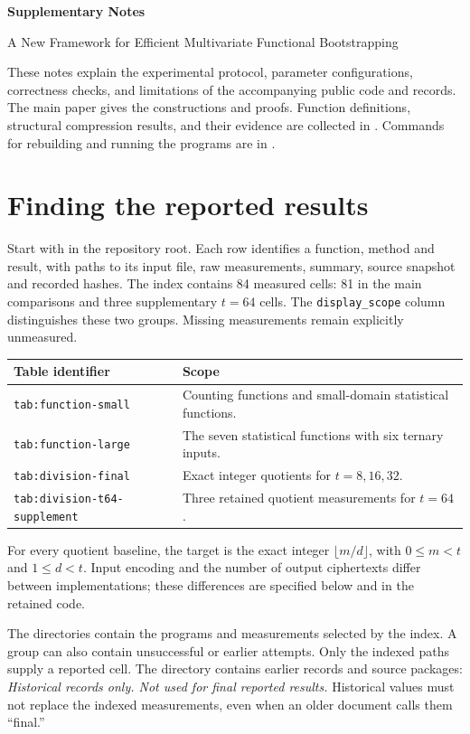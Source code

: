 \documentclass[11pt,a4paper]{article}
\begin{document}
\begin{center}
{\LARGE\bfseries Supplementary Notes}\par\medskip
{\large A New Framework for Efficient Multivariate Functional Bootstrapping}
\end{center}
These notes explain the experimental protocol, parameter configurations, correctness checks, and limitations of the accompanying public code and records. The main paper gives the constructions and proofs. Function definitions, structural compression results, and their evidence are collected in . Commands for rebuilding and running the programs are in .

\section*{Finding the reported results}
Start with  in the repository root. Each row identifies a function, method and result, with paths to its input file, raw measurements, summary, source snapshot and recorded hashes. The index contains 84 measured cells: 81 in the main comparisons and three supplementary $t=64$ cells. The \texttt{display\_scope} column distinguishes these two groups. Missing measurements remain explicitly unmeasured.

\begin{center}\small
\begin{tabularx}{\linewidth}{@{}lX@{}}\toprule
Table identifier & Scope\\\midrule
\texttt{tab:function-small} & Counting functions and small-domain statistical functions.\\
\texttt{tab:function-large} & The seven statistical functions with six ternary inputs.\\
\texttt{tab:division-final} & Exact integer quotients for $t=8,16,32$.\\
\texttt{tab:division-t64-supplement} & Three retained quotient measurements for $t=64$.\\\bottomrule
\end{tabularx}
\end{center}
For every quotient baseline, the target is the exact integer $\lfloor m/d\rfloor$, with $0\le m<t$ and $1\le d<t$. Input encoding and the number of output ciphertexts differ between implementations; these differences are specified below and in the retained code.

The  directories contain the programs and measurements selected by the index. A group can also contain unsuccessful or earlier attempts. Only the indexed paths supply a reported cell. The directory  contains earlier records and source packages: \emph{Historical records only. Not used for final reported results.} Historical values must not replace the indexed measurements, even when an older document calls them ``final.''
\end{document}
